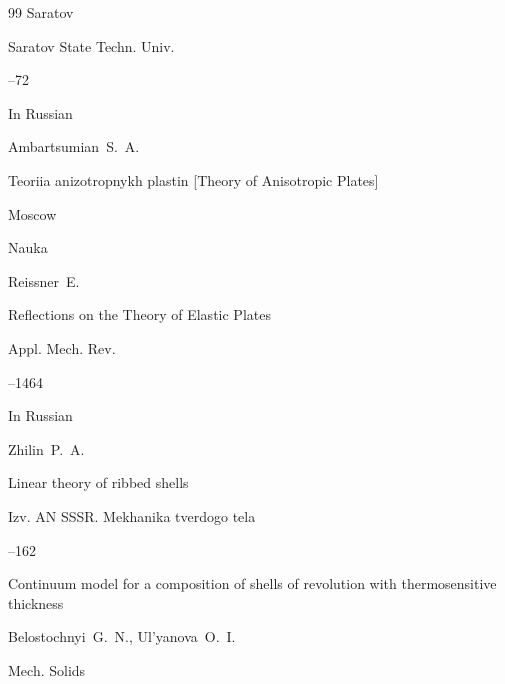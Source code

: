 \begin{thebibliography}{99}
\publaddr Saratov

\publ Saratov State Techn. Univ.


--72








\lang In Russian

\by Ambartsumian~S.~A.

\book Teoriia anizotropnykh plastin \rm [Theory of Anisotropic Plates]

\publaddr Moscow

\publ Nauka






\by Reissner~E.

 Reflections on the Theory of Elastic Plates

\jour Appl. Mech. Rev.



--1464 










\lang In Russian

\by Zhilin~P.~A.

\paper Linear theory of ribbed shells 

\jour Izv. AN SSSR. Mekhanika tverdogo tela 



--162




\paper Continuum model for a composition of shells of revolution with thermosensitive thickness

\by Belostochnyi~G.~N., Ul'yanova~O.~I.

\jour Mech. Solids




\end{thebibliography}
